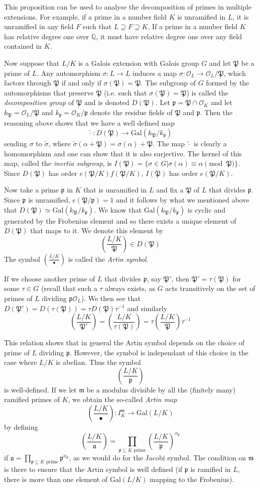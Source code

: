 \documentclass[]{amsart}
\newcommand{\Q}{\mathbb{Q}}
\newcommand{\rarr}{\longrightarrow}
\newcommand{\m}{\mathfrak{m}}
\newcommand{\IKm}{I^\mathfrak{m}_K}
\renewcommand{\a}{\mathfrak{a}}
\newcommand{\OK}{\mathcal{O}_K}
\newcommand{\OL}{\mathcal{O}_L}
\newcommand{\p}{\mathfrak{p}}
\renewcommand{\P}{\mathfrak{P}}
\newcommand{\Frob}[2]{\left(\frac{#1}{#2}\right )}
\newcommand{\Gal}{\text{Gal}}
\begin{document}
		This proposition can be used to analyse the decomposition of primes in multiple extensions. For example, if a prime in a number field $K$ is unramified in $L$, it is unramified in any field $F$ such that $L\supseteq F\supseteq K$. If a prime in a number field $K$ has relative degree one over $\Q$, it must have relative degree one over any field contained in $K$.
		
		Now suppose that $L/K$ is a Galois extension with Galois group $G$ and let $\P$ be a prime of $L$. Any automorphism $\sigma:L\rarr L$ induces a map $\sigma:\OL\rarr\OL/\P$, which factors through $\P$ if and only if $\sigma(\P)=\P$. The subgroup of $G$ formed by the automorphisms that preserve $\P$ (i.e. such that $\sigma(\P)=\P$) is called the \emph{decomposition group }of $\P$ and is denoted $D(\P)$. Let $\p=\P\cap\OK$ and let $k_{\P}=\OL/\P$ and $k_\p=\OK/\p$ denote the residue fields of $\P$ and $\p$. Then the reasoning above shows that we have a well defined map
		\[\tilde{\cdot}:D(\P)\rarr\Gal(k_\P/k_\p)\]
		sending $\sigma$ to $\tilde{\sigma}$, where $\tilde{\sigma}(\alpha+\P)=\sigma(\alpha)+\P$. The map $\tilde{\cdot}$ is clearly a homomorphism and one can show that it is also surjective. The kernel of this map, called the \emph{inertia subgroup}, is $I(\P)=\{\sigma\in G|\sigma(\alpha)\equiv\alpha\pmod\P\}$. Since $D(\P)$ has order $e(\P/K)f(\P/K)$, $I(\P)$ has order $e(\P/K)$.
		
		Now take a prime $\p$ in $K$ that is unramified in $L$ and fix a $\P$ of $L$ that divides $\p$. Since $\p$ is unramified, $e(\P/\p)=1$ and it follows by what we mentioned above that $D(\P)\simeq\Gal(k_\P/k_\p)$. We know that $\Gal(k_\P/k_\p)$ is cyclic and generated by the Frobenius element and so there exists a unique element of $D(\P)$ that maps to it. We denote this element by
		\[\Frob{L/K}{\P}\in D(\P)\]
		The symbol $\Frob{L/K}{\bullet}$ is called the \emph{Artin symbol}. 
		
		If we choose another prime of $L$ that divides $\p$, say $\P'$, then $\P'=\tau(\P)$ for some $\tau\in G$ (recall that such a $\tau$ always exists, as $G$ acts transitively on the set of primes of $L$ dividing $\p\OL$). We then see that $D(\P')=D(\tau(\P))=\tau D(\P)\tau^{-1}$ and similarly 
		\[\Frob{L/K}{\P'}=\Frob{L/K}{\tau(\P)}=\tau\Frob{L/K}{\P}\tau^{-1}\]
		
		This relation shows that in general the Artin symbol depends on the choice of prime of $L$ dividing $\p$. However, the symbol is independant of this choice in the case where $L/K$ is abelian. Thus the symbol
		\[\Frob{L/K}{\p}\]
		is well-defined. If we let $\m$ be a modulus divisible by all the (finitely many) ramified primes of $K$, we obtain the so-called \emph{Artin map}
		\[\Frob{L/K}{\bullet}:\IKm\rarr\Gal(L/K)\]
		by defining
		\[\Frob{L/K}{\a}=\prod_{\p\subseteq K\text{ prime}}\Frob{L/K}{\p}^{\alpha_\p}\]
		if $\a=\prod_{\p\subseteq K\text{ prime}}\p^{\alpha_\p}$, as we would do for the Jacobi symbol. The condition on $\m$ is there to ensure that the Artin symbol is well defined (if $\p$ is ramified in $L$, there is more than one element of $\Gal(L/K)$ mapping to the Frobenius).
		
\end{document}
